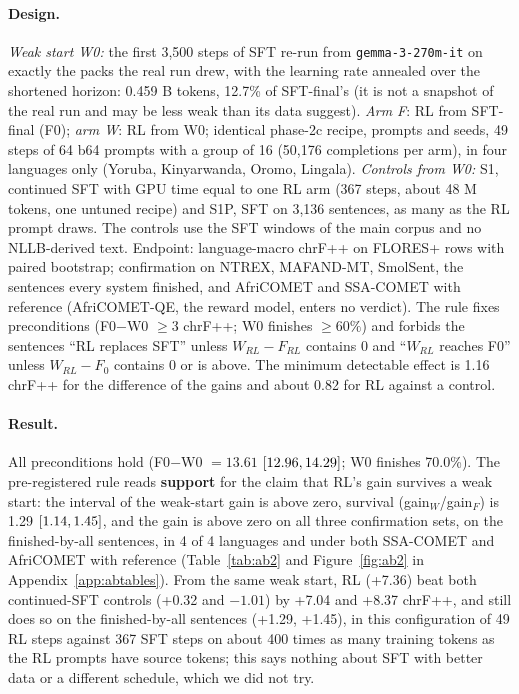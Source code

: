 \paragraph{Design.} \emph{Weak start W0:} the first 3,500 steps of SFT re-run from \texttt{gemma-3-270m-it} on exactly the packs the real run drew, with the learning rate annealed over the shortened horizon: 0.459 B tokens, 12.7\% of SFT-final's (it is not a snapshot of the real run and may be less weak than its data suggest). \emph{Arm F}: RL from SFT-final (F0); \emph{arm W}: RL from W0; identical phase-2c recipe, prompts and seeds, 49 steps of 64 b64 prompts with a group of 16 (50,176 completions per arm), in four languages only (Yoruba, Kinyarwanda, Oromo, Lingala). \emph{Controls from W0:} S1, continued SFT with GPU time equal to one RL arm (367 steps, about 48 M tokens, one untuned recipe) and S1P, SFT on 3,136 sentences, as many as the RL prompt draws. The controls use the SFT windows of the main corpus and no NLLB-derived text. Endpoint: language-macro chrF++ on FLORES+ \nopair{} rows with paired bootstrap; confirmation on NTREX, MAFAND-MT, SmolSent, the sentences every system finished, and AfriCOMET and SSA-COMET with reference (AfriCOMET-QE, the reward model, enters no verdict). The rule fixes preconditions (F0$-$W0 $\ge3$ chrF++; W0 finishes $\ge60\%$) and forbids the sentences ``RL replaces SFT'' unless $W_{RL}-F_{RL}$ contains 0 and ``$W_{RL}$ reaches F0'' unless $W_{RL}-F_0$ contains 0 or is above. The minimum detectable effect is 1.16 chrF++ for the difference of the gains and about 0.82 for RL against a control.

\paragraph{Result.} All preconditions hold (F0$-$W0 $=13.61$ $[12.96, 14.29]$; W0 finishes 70.0\%). The pre-registered rule reads \textbf{support} for the claim that RL's gain survives a weak start: the interval of the weak-start gain is above zero, survival (gain$_W$/gain$_F$) is 1.29 $[1.14, 1.45]$, and the gain is above zero on all three confirmation sets, on the finished-by-all sentences, in 4 of 4 languages and under both SSA-COMET and AfriCOMET with reference (Table~\ref{tab:ab2} and Figure~\ref{fig:ab2} in Appendix~\ref{app:abtables}). From the same weak start, RL (+7.36) beat both continued-SFT controls (+0.32 and $-1.01$) by +7.04 and +8.37 chrF++, and still does so on the finished-by-all sentences (+1.29, +1.45), in this configuration of 49 RL steps against 367 SFT steps on about 400 times as many training tokens as the RL prompts have source tokens; this says nothing about SFT with better data or a different schedule, which we did not try.


